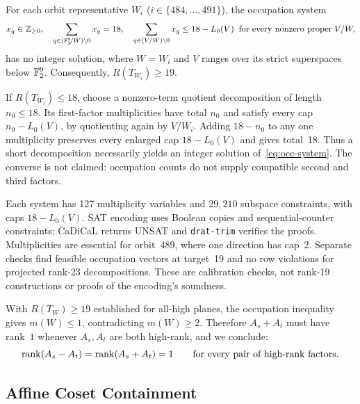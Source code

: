 \documentclass[11pt,a4paper]{article}
\begin{document}
\begin{proposition}\label{prop:dim2}
  For each orbit representative $W_i$ ($i\in\{484,\ldots,491\}$), the occupation system
  \begin{equation}\label{eq:occ-system}
    x_q\in\mathbb{Z}_{\ge 0},\quad \sum_{q\in(\mathbb{F}_2^9\!/W)\setminus 0}x_q = 18,\quad
    \sum_{q\in (V/W)\setminus 0}x_q \le 18-L_0(V) \;\;\text{for every nonzero proper}\;V/W,
  \end{equation}
  has no integer solution, where $W=W_i$ and $V$ ranges over its strict superspaces below $\mathbb{F}_2^9$. Consequently, $R(T_{W_i})\ge19$.
\end{proposition}

If $R(T_{W_i})\le18$, choose a nonzero-term quotient decomposition of length $n_0\le18$. Its first-factor multiplicities have total $n_0$ and satisfy every cap $n_0-L_0(V)$, by quotienting again by $V/W_i$. Adding $18-n_0$ to any one multiplicity preserves every enlarged cap $18-L_0(V)$ and gives total~18. Thus a short decomposition necessarily yields an integer solution of~\eqref{eq:occ-system}. The converse is not claimed: occupation counts do not supply compatible second and third factors.

Each system has 127 multiplicity variables and $29{,}210$ subspace constraints, with caps $18-L_0(V)$. SAT encoding uses Boolean copies and sequential-counter constraints; CaDiCaL returns UNSAT and \texttt{drat-trim} verifies the proofs. Multiplicities are essential for orbit~489, where one direction has cap~2. Separate checks find feasible occupation vectors at target~19 and no row violations for projected rank-23 decompositions. These are calibration checks, not rank-19 constructions or proofs of the encoding's soundness.

\medskip

With $R(T_W)\ge19$ established for all-high planes, the occupation inequality gives $m(W)\le1$, contradicting $m(W)\ge2$. Therefore $A_s+A_t$ must have rank~$1$ whenever $A_s,A_t$ are both high-rank, and we conclude:
\begin{equation}\label{eq:rkone}
  \operatorname{rank}(A_s-A_t) = \operatorname{rank}(A_s+A_t) = 1 \qquad\text{for every pair of high-rank factors}.
\end{equation}

\subsection{Affine Coset Containment}\label{sec:coset}
\end{document}

